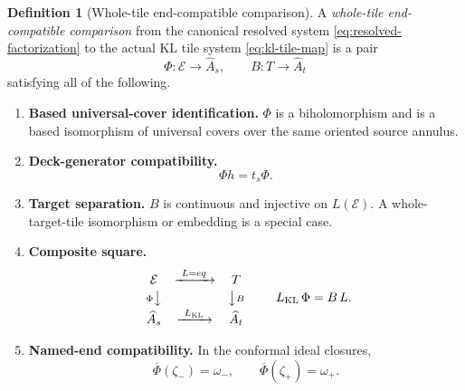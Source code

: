 \documentclass[11pt,reqno]{amsart}
\theoremstyle{definition}
\newtheorem{definition}[theorem]{Definition}
\theoremstyle{remark}
\begin{document}
\begin{definition}[Whole-tile end-compatible comparison]\label{def:whole-tile-comparison}
A \emph{whole-tile end-compatible comparison} from the canonical resolved system \eqref{eq:resolved-factorization} to the actual KL tile system \eqref{eq:kl-tile-map} is a pair
\begin{equation}\label{eq:comparison-pair}
\Phi\colon\mathcal E\longrightarrow\widehat A_s,
\qquad
B\colon T\longrightarrow\widehat A_t
\end{equation}
satisfying all of the following.
\begin{enumerate}
\item \textbf{Based universal-cover identification.}  \(\Phi\) is a biholomorphism and is a based isomorphism of universal covers over the same oriented source annulus.
\item \textbf{Deck-generator compatibility.}
\begin{equation}\label{eq:deck-generator-compat}
\Phi h=t_s\Phi.
\end{equation}
\item \textbf{Target separation.}  \(B\) is continuous and injective on \(L(\mathcal E)\).  A whole-target-tile isomorphism or embedding is a special case.
\item \textbf{Composite square.}
\begin{equation}\label{eq:comparison-square}
\begin{array}{ccc}
\mathcal E&\xrightarrow{\ L=e q\ }&T\\[2pt]
{\scriptstyle\Phi}\big\downarrow&&\big\downarrow{\scriptstyle B}\\[2pt]
\widehat A_s&\xrightarrow{\ L_{\mathrm{KL}}\ }&\widehat A_t
\end{array}
\qquad
L_{\mathrm{KL}}\,\Phi=B\,L.
\end{equation}
\item \textbf{Named-end compatibility.}  In the conformal ideal closures,
\begin{equation}\label{eq:named-end-compat}
\overline\Phi(\zeta_-)=\omega_-,
\qquad
\overline\Phi(\zeta_+)=\omega_+.
\end{equation}
\end{enumerate}
\end{definition}
\end{document}

